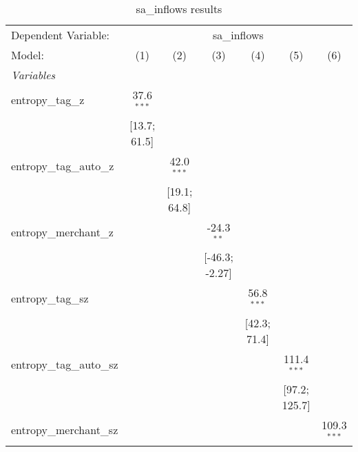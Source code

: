 
\begin{table}[htbp]
   \centering
   \tiny
   \begin{threeparttable}[b]
      \caption{\label{tab:reg_sa_inflows_full_nofe.tex} sa\_inflows results}
      \begin{tabular}{lcccccc}
         \tabularnewline \midrule \midrule
         Dependent Variable: & \multicolumn{6}{c}{sa\_inflows}\\
         Model:                    & (1)              & (2)              & (3)              & (4)              & (5)              & (6)\\  
         \midrule
         \emph{Variables}\\
         entropy\_tag\_z           & 37.6$^{***}$     &                  &                  &                  &                  &   \\   
                                   & [13.7; 61.5]     &                  &                  &                  &                  &   \\   
         entropy\_tag\_auto\_z     &                  & 42.0$^{***}$     &                  &                  &                  &   \\   
                                   &                  & [19.1; 64.8]     &                  &                  &                  &   \\   
         entropy\_merchant\_z      &                  &                  & -24.3$^{**}$     &                  &                  &   \\   
                                   &                  &                  & [-46.3; -2.27]   &                  &                  &   \\   
         entropy\_tag\_sz          &                  &                  &                  & 56.8$^{***}$     &                  &   \\   
                                   &                  &                  &                  & [42.3; 71.4]     &                  &   \\   
         entropy\_tag\_auto\_sz    &                  &                  &                  &                  & 111.4$^{***}$    &   \\   
                                   &                  &                  &                  &                  & [97.2; 125.7]    &   \\   
         entropy\_merchant\_sz     &                  &                  &                  &                  &                  & 109.3$^{***}$\\   

\end{tabular}
\end{threeparttable}
\end{table}
